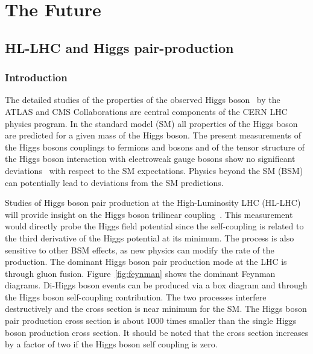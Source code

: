 

\providecommand{\phasezero}{Phase-0}
\providecommand{\phaseone}{Phase-I}
\providecommand{\phasetwo}{Phase-II}

\chapter{The Future}

\section{HL-LHC and Higgs pair-production}

\subsection{Introduction}
\label{sec:intro}
The detailed studies of the properties of the observed Higgs
boson~\cite{AtlasPaperCombination, CMSPaperCombination,
  CMSPaperCombination2} by the ATLAS and CMS Collaborations are central components of the CERN LHC physics program. In the standard model (SM) all properties of the Higgs boson are predicted for a given mass of the Higgs boson. The present measurements of the Higgs bosons couplings to fermions and bosons and of the tensor structure of the Higgs boson interaction with electroweak gauge bosons show no
significant deviations~\cite{Khachatryan:2014jba,PhysRevD.92.012004} with respect to the SM expectations. Physics beyond the SM (BSM) can potentially lead to deviations from the SM predictions. 

Studies of Higgs boson pair production at the High-Luminosity LHC (HL-LHC) will provide
insight on the  Higgs boson trilinear coupling~\cite{Glover:1987nx,Plehn:1996wb,Djouadi:1999rca,Gianotti:2002xx,Baur:2003gpa,Baur:2003gp,Baglio:2012np}. 
This measurement would directly probe the Higgs field potential since the self-coupling is related to the third derivative of the Higgs potential at its minimum. The process is also
sensitive to other BSM effects, as new physics can modify the rate of the production. The dominant Higgs boson pair production mode at the LHC is through gluon fusion. Figure~\ref{fig:feynman} shows the 
dominant Feynman diagrams. Di-Higgs boson events can be produced via a box
diagram and through the Higgs boson self-coupling contribution. The two
processes interfere destructively and the cross section is near
minimum for the SM. The Higgs boson pair production cross  section
is about $1000$ times smaller than the single Higgs boson production cross
section. It should be noted that the cross section increases
by a factor of two if the Higgs boson self coupling is zero.  

